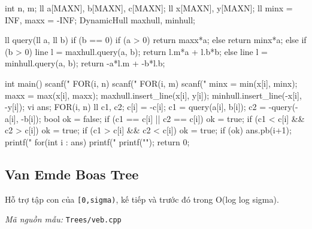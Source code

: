 \documentclass[11pt]{article}
\newcommand{\codepath}[1]{\par\noindent\textit{Mã nguồn mẫu:} \texttt{#1}\par}
\begin{document}
\begin{vncode}
int n, m;
ll a[MAXN], b[MAXN], c[MAXN];
ll x[MAXN], y[MAXN];
ll minx = INF, maxx = -INF;
DynamicHull maxhull, minhull;

ll query(ll a, ll b) {
	if (b == 0) {
		if (a > 0) return maxx*a;
		else return minx*a;
	}
	else if (b > 0) {
		line l = maxhull.query(a, b);
		return l.m*a + l.b*b;
	}
	else {
		line l = minhull.query(a, b);
		return -a*l.m + -b*l.b;
	}
}

int main() {
	scanf("%
	FOR(i, n) scanf("%
	FOR(i, m) {
		scanf("%
		minx = min(x[i], minx);
		maxx = max(x[i], maxx);
		maxhull.insert_line(x[i], y[i]);
		minhull.insert_line(-x[i], -y[i]);
	}
	vi ans;
	FOR(i, n) {
		ll c1, c2;
		c[i] = -c[i];
		c1 = query(a[i], b[i]);
		c2 = -query(-a[i], -b[i]);
		bool ok = false;
		if (c1 == c[i] || c2 == c[i]) ok = true;
		if (c1 < c[i] && c2 > c[i]) ok = true;
		if (c1 > c[i] && c2 < c[i]) ok = true;
		if (ok) ans.pb(i+1);
	}
	printf("%
	for(int i : ans) printf("%
	printf("\n");
	return 0;
}
\end{vncode}
\endgroup


\subsection{Van Emde Boas Tree}

Hỗ trợ tập con của \texttt{[0,sigma)}, kế tiếp và trước đó trong O(log log sigma).

\codepath{Trees/veb.cpp}
\end{document}
